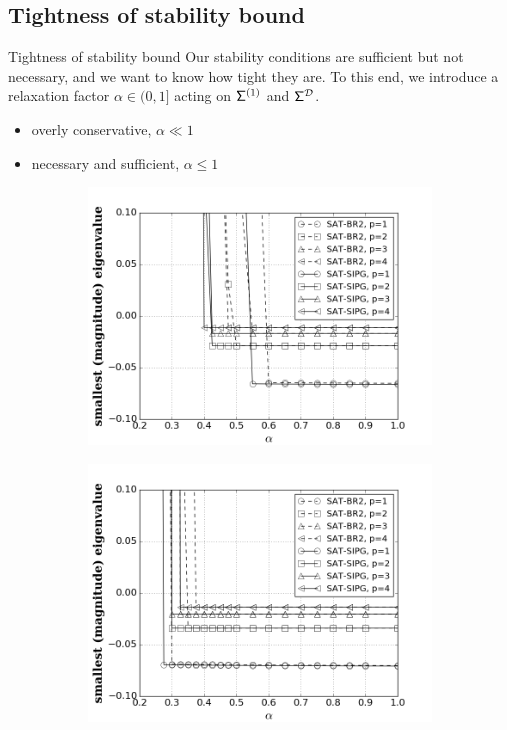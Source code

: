 \documentclass{beamer}
\begin{document}
\subsection{Tightness of stability bound}
\begin{frame}{Tightness of stability bound}
    Our stability conditions are sufficient but not necessary, and we want to know how tight they are. To this end, we introduce a relaxation factor 
    $\alpha \in (0,1]$ acting on $\mathsf{\Sigma}^{(1)}$ and $\mathsf{\Sigma}^{\mathcal{D}}$.
    \begin{itemize}
        \item overly conservative, $\alpha \ll 1$
        \item necessary and sufficient, $\alpha \le 1$ 
    \end{itemize}
    \begin{figure} 
        \begin{subfigure}{0.45\textwidth}
            \centering
            \includegraphics[width=1.0\linewidth]{figures/relaxation_eigMin_gamma.png}
        \end{subfigure}
        \begin{subfigure}{0.45\textwidth}
            \centering
            \includegraphics[width=1.0\linewidth]{figures/relaxation_eigMin_omega.png}

\end{subfigure}
\end{figure}
\end{frame}
\end{document}
